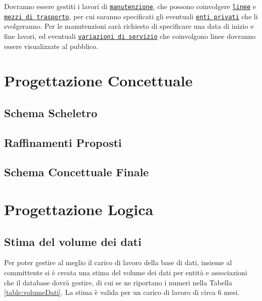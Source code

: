 \documentclass[12pt,a4paper]{report}
\begin{document}
Dovranno essere gestiti i lavori di \underline{\texttt{manutenzione}}, che possono coinvolgere \underline{\texttt{linee}} e \underline{\texttt{mezzi di trasporto}}, per cui saranno specificati gli eventuali \underline{\texttt{enti privati}} che li svolgeranno. Per le manutenzioni sarà richiesto di specificare una data di inizio e fine lavori, ed eventuali \underline{\texttt{variazioni di servizio}} che coinvolgono linee dovranno essere visualizzate al pubblico.

\chapter{Progettazione Concettuale}
\section{Schema Scheletro}
\section{Raffinamenti Proposti}
\section{Schema Concettuale Finale}

\chapter{Progettazione Logica}
\section{Stima del volume dei dati}
Per poter gestire al meglio il carico di lavoro della base di dati, insieme al committente si è creata una stima del volume dei dati per entità e associazioni che il database dovrà gestire, di cui se ne riportano i numeri nella Tabella \ref{table:volumeDati}.
La stima è valida per un carico di lavoro di circa 6 mesi.
\end{document}

